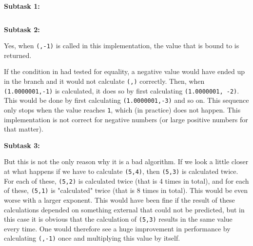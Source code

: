 \textbf{Subtask 1:}

\inputminted{csharp}{\context/answer/Timing.cs}

\textbf{Subtask 2:}

Yes, when \texttt{(,-1)} is called in this implementation, the value that  is bound to is returned.

If the condition in  had tested for equality, a negative  value would have ended up in the  branch and it would not calculate \texttt{(,)} correctly. Then, when \texttt{(1.0000001,-1)} is calculated, it does so by first calculating \texttt{(1.0000001, -2)}. This would be done by first calculating \texttt{(1.0000001,-3)} and so on. This sequence only stops when the  value reaches \texttt{1}, which (in practice) does not happen. This implementation is not correct for negative numbers (or large positive numbers for that matter).

\textbf{Subtask 3:}

But this is not the only reason why it is a bad algorithm. If we look a little closer at what happens if we have to calculate \texttt{(5,4)}, then \texttt{(5,3)} is calculated twice. For each of these, \texttt{(5,2)} is calculated twice (that is 4 times in total), and for each of these, \texttt{(5,1)} is "calculated" twice (that is 8 times in total). This would be even worse with a larger exponent. This would have been fine if the result of these calculations depended on something external that could not be predicted, but in this case it is obvious that the calculation of \texttt{(5,3)} results in the same value every time. One would therefore see a huge improvement in performance by calculating \texttt{(,-1)} once and multiplying this value by itself.
